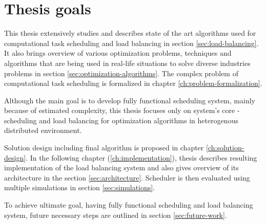 \section{Thesis goals}\label{sec:thesis-goals}

This thesis extensively studies and describes state of the art algorithms used for computational task scheduling
and load balancing in section \ref{sec:load-balancing}. 
It also brings overview of various optimization problems, techniques and algorithms 
that are being used in real-life situations to solve diverse industries problems 
in section \ref{sec:optimization-algorithms}.
The complex problem of computational task scheduling is formalized in chapter \ref{ch:problem-formalization}.

Although the main goal is to develop fully functional scheduling system,
mainly because of estimated complexity,
this thesis focuses only on system's core - 
scheduling and load balancing for optimization algorithms in heterogenous distributed environment.

Solution design including final algorithm is proposed in chapter \ref{ch:solution-design}.
In the following chapter (\ref{ch:implementation}),
thesis describes resulting implementation of the load balancing system
and also gives overview of its architecture in the section \ref{sec:architecture}.
Scheduler is then evaluated using multiple simulations in section \ref{sec:simulations}.

To achieve ultimate goal, having fully functional scheduling and load balancing system,
future necessary steps are outlined in section \ref{sec:future-work}.